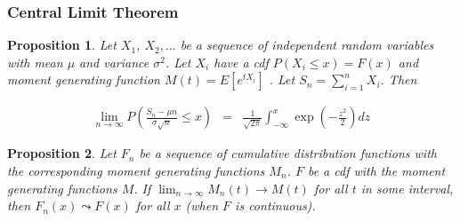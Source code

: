 \documentclass{beamer}
\newtheorem{prop}{Proposition}
\numberwithin{equation}{section}
\begin{document}
\begin{frame}
\frametitle{Central Limit Theorem}

\begin{prop}
Let $X_{1}$, $X_{2}, \hdots$ be a sequence of independent random variables with mean $\mu$ and variance $\sigma^2$.  Let $X_{i}$ have a cdf $P(X_{i} \leq x) = F(x)$ and moment generating function $M(t) = E[e^{tX_{i}}]$ .  Let $S_{n} = \sum_{i=1}^{n} X_{i}$.  Then 

\begin{eqnarray}
\lim_{n\rightarrow \infty} P\left( \frac{S_{n} - \mu n }{\sigma\sqrt{n}} \leq x \right) &  = &  \frac{1}{\sqrt{2\pi} } \int_{-\infty}^{x} \exp\left( -\frac{z^{2} }{2} \right) dz \nonumber 
\end{eqnarray}


\end{prop}

\pause 
{}
\begin{itemize}
\end{itemize}


\end{frame}


\begin{frame}

\begin{prop}
Let $F_{n}$ be a sequence of cumulative distribution functions with the corresponding moment generating functions $M_{n}$.  $F$ be a cdf with the moment generating functions $M$.  If $\lim_{n\rightarrow \infty} M_{n}(t) \rightarrow M(t)$ for all $t$ in some interval, then $F_{n}(x) \leadsto F(x)$ for all $x$ (when $F$ is continuous).  
\end{prop}

\pause 
{}

\pause 




\end{frame}
\end{document}
